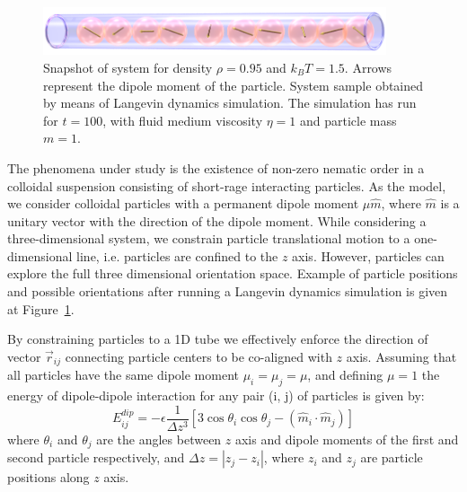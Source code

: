 \documentclass[12pt, a4paper]{article}
\author{Maksym Polovyi}
\newcommand{\figref}[1]{Figure~\ref{#1}}
\begin{document}
\subsection{}
\begin{figure}[t]
\centering
	\includegraphics[width=0.9\textwidth]{Images/fullSystemPicture}
	\captionsetup{justification=centering, width=0.9\textwidth}
	\caption{Snapshot of system for density $\rho = 0.95$ and $k_BT = 1.5$. Arrows represent the dipole moment of the particle. System sample obtained by means of Langevin dynamics simulation. The simulation has run for $t = 100$, with fluid medium viscosity $\eta = 1$ and particle mass $m = 1$.}
	\label{fig:fullSystemPicture}
\end{figure}

The phenomena under study is the existence of non-zero nematic order in a colloidal suspension consisting of short-rage interacting particles. As the model, we consider colloidal particles with a permanent dipole moment $\mu \hat{m}$, where $\hat{m}$ is a unitary vector with the direction of the dipole moment. While considering a three-dimensional system, we constrain particle translational motion to a one-dimensional line, i.e. particles are confined to the $z$ axis. However, particles can explore the full three dimensional orientation space. Example of particle positions and possible orientations after running a Langevin dynamics simulation is given at \figref{fig:fullSystemPicture}.

By constraining particles to a 1D tube we effectively enforce the direction of vector $\vec{r}_{ij}$ connecting particle centers to be co-aligned with $z$ axis. Assuming that all particles have the same dipole moment $\mu_i = \mu_j = \mu$, and defining $\mu = 1$ the energy of dipole-dipole interaction for any pair (i, j) of particles is given by:
\begin{equation}
\label{eq:dipole_dipole_1D}
E_{ij}^{dip} = - \epsilon \frac{1}{\Delta z^3} [3 \cos \theta_i \cos \theta_j - (\hat{m}_i \cdot \hat{m}_j)]
\end{equation}
where $\theta_i$ and $\theta_j$ are the angles between $z$ axis and dipole moments of the first and second particle respectively, and $\Delta z = |z_j - z_i|$, where $z_i$ and $z_j$ are particle positions along $z$ axis.
\end{document}
